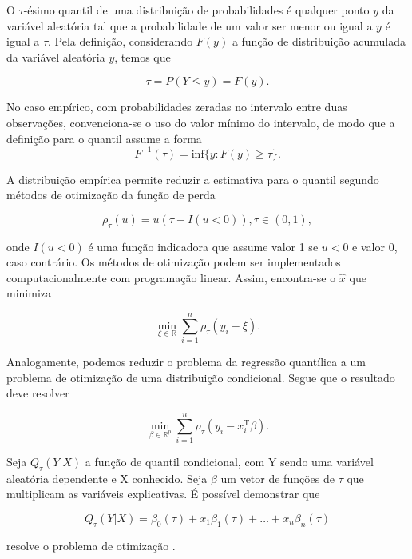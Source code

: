 O $\tau$-ésimo quantil de uma distribuição de probabilidades é qualquer ponto $y$ da variável aleatória tal que a probabilidade de um valor ser menor ou igual a $y$ é igual a $\tau$. Pela definição, considerando $F(y)$ a função de distribuição acumulada da variável aleatória $y$, temos que

\begin{equation}
\tau = P(Y \leq y) = F(y).
\end{equation}

No caso empírico, com probabilidades zeradas no intervalo entre duas observações, convenciona-se o uso do valor mínimo do intervalo, de modo que a definição para o quantil assume a forma
\begin{equation}
F^{-1}(\tau) = \text{inf}\{y: F(y) \geq \tau\}.
\end{equation}

A distribuição empírica permite reduzir a estimativa para o quantil segundo métodos de otimização da função de perda

\begin{equation}
\rho_\tau(u) = u(\tau - I(u < 0)), \tau \in (0, 1),
\end{equation}

\noindent onde $I(u < 0)$ é uma função indicadora que assume valor 1 se $u < 0$ e valor 0, caso contrário. Os métodos de otimização podem ser implementados computacionalmente com programação linear. Assim, encontra-se o $\hat{x}$ que minimiza

\begin{equation}
\displaystyle \min_{\xi \in \mathbb{R}} \displaystyle \sum_{i=1}^{n} \rho_\tau(y_i - \xi).
\end{equation}

Analogamente, podemos reduzir o problema da regressão quantílica a um problema de otimização de uma distribuição condicional. Segue que o resultado deve resolver

\begin{equation}
\displaystyle \min_{\beta \in \mathbb{R}^{p}} \displaystyle \sum_{i=1}^{n} \rho_\tau(y_i - x_i^{\text{T}}\beta).
\end{equation}


Seja $Q_\tau(Y | X)$ a função de quantil condicional, com Y sendo uma variável aleatória dependente e X conhecido. Seja $\beta$ um vetor de funções de $\tau$ que multiplicam as variáveis explicativas. É possível demonstrar que

\begin{equation}
Q_\tau(Y | X) = \beta_0(\tau) + x_1 \beta_1(\tau) + \dots + x_n \beta_n(\tau) 
\end{equation}

\noindent resolve o problema de otimização \cite{koenker2005}.
